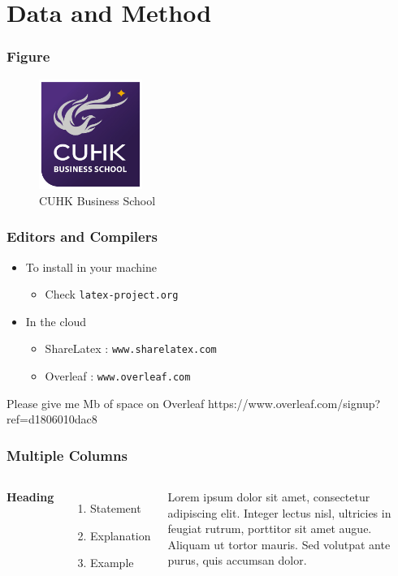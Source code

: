 \documentclass[10pt,aspectratio=32]{beamer}
\begin{document}
\section{Data and Method}

\begin{frame}
 \frametitle{Figure}
 \vspace{-0.3cm}
	\begin{figure}[h]
		\centering
		\includegraphics[width=0.3\textwidth]{cuba_logo}
		\caption{CUHK Business School}
	\end{figure}
\end{frame}


\begin{frame}
	\frametitle{Editors and Compilers}
	\begin{itemize}
		\item To install in your machine
		\begin{itemize}
			\item Check \texttt{latex-project.org}
		\end{itemize}
		\item In the cloud
		\begin{itemize}
			\item ShareLatex : \texttt{www.sharelatex.com}
			\item Overleaf : \texttt{www.overleaf.com}
		\end{itemize}
	\end{itemize}
	\vskip 1cm
	\begin{block}{Please give me Mb of space on Overleaf}
		https://www.overleaf.com/signup?ref=d1806010dac8
	\end{block}
\end{frame}


\begin{frame}
	\frametitle{Multiple Columns}
	\begin{columns}[c]
		\textbf{Heading}
		\begin{enumerate}
			\item Statement
			\item Explanation
			\item Example
		\end{enumerate}
		Lorem ipsum dolor sit amet, consectetur adipiscing elit. Integer lectus nisl, ultricies in feugiat rutrum, porttitor sit amet augue. Aliquam ut tortor mauris. Sed volutpat ante purus, quis accumsan dolor.
	\end{columns}
\end{frame}
\end{document}

